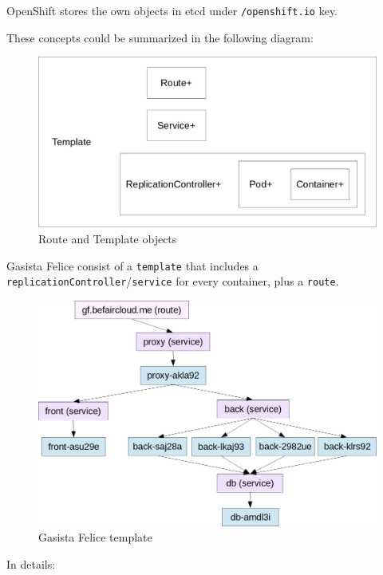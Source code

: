 OpenShift stores the own objects in etcd under \texttt{/openshift.io}
key.

These concepts could be summarized in the following diagram:

\begin{figure}[htbp]
\centering
\includegraphics{media/ch5-template.png}
\caption{Route and Template objects}
\end{figure}

Gasista Felice consist of a \texttt{template} that includes a
\texttt{replicationController}/\texttt{service} for every container,
plus a \texttt{route}.

\begin{figure}[htbp]
\centering
\includegraphics{media/ch5-template-gf.png}
\caption{Gasista Felice template}
\end{figure}

In details:

